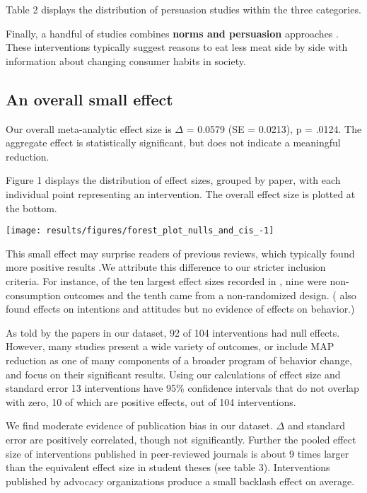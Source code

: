 \documentclass[sn-nature,pdflatex]{sn-jnl}
\begin{document}
Table 2 displays the distribution of persuasion studies within the three
categories.

Finally, a handful of studies combines \textbf{norms and persuasion}
approaches
\citep{hennessy2016, carfora2023, lacroix2020, mattson2020, piester2020}.
These interventions typically suggest reasons to eat less meat side by
side with information about changing consumer habits in society.

\subsection{An overall small effect}\label{sec2.2}

Our overall meta-analytic effect size is \(\Delta\) = 0.0579 (SE =
0.0213), p = .0124. The aggregate effect is statistically significant,
but does not indicate a meaningful reduction.

Figure 1 displays the distribution of effect sizes, grouped by paper,
with each individual point representing an intervention. The overall
effect size is plotted at the bottom.

\texttt{[image: results/figures/forest\_plot\_nulls\_and\_cis\_-1]}

This small effect may surprise readers of previous reviews, which
typically found more positive results
\citep{mathur2021meta, meier2022, chang2023}.We attribute this
difference to our stricter inclusion criteria. For instance, of the ten
largest effect sizes recorded in \citep{mathur2021effectiveness}, nine
were non-consumption outcomes and the tenth came from a non-randomized
design. (\citep{bianchi2018conscious} also found effects on intentions
and attitudes but no evidence of effects on behavior.)

As told by the papers in our dataset, 92 of 104 interventions had null
effects. However, many studies present a wide variety of outcomes, or
include MAP reduction as one of many components of a broader program of
behavior change, and focus on their significant results. Using our
calculations of effect size and standard error 13 interventions have
95\% confidence intervals that do not overlap with zero, 10 of which are
positive effects, out of 104 interventions.

We find moderate evidence of publication bias in our dataset. \(\Delta\)
and standard error are positively correlated, though not significantly.
Further the pooled effect size of interventions published in
peer-reviewed journals is about 9 times larger than the equivalent
effect size in student theses (see table 3). Interventions published by
advocacy organizations produce a small backlash effect on average.
\end{document}
